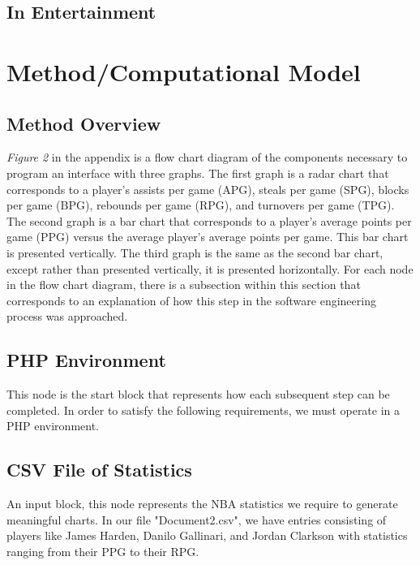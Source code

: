 \documentclass[journal]{vgtc}                %
\begin{document}
\subsection{In Entertainment}



\section{Method/Computational Model}
\subsection{Method Overview}
\emph{Figure 2} in the appendix is a flow chart diagram of the components necessary to program an interface with three graphs. The first graph is a radar chart that corresponds to a player's assists per game (APG), steals per game (SPG), blocks per game (BPG), rebounds per game (RPG), and turnovers per game (TPG). The second graph is a bar chart that corresponds to a player's average points per game (PPG) versus the average player's average points per game. This bar chart is presented vertically. The third graph is the same as the second bar chart, except rather than presented vertically, it is presented horizontally. For each node in the flow chart diagram, there is a subsection within this section that corresponds to an explanation of how this step in the software engineering process was approached. 
\subsection{PHP Environment}
This node is the start block that represents how each subsequent step can be completed. In order to satisfy the following requirements, we must operate in a PHP environment.
\subsection{CSV File of Statistics}
An input block, this node represents the NBA statistics we require to generate meaningful charts. In our file "Document2.csv", we have entries consisting of players like James Harden, Danilo Gallinari, and Jordan Clarkson with statistics ranging from their PPG to their RPG.
\end{document}
